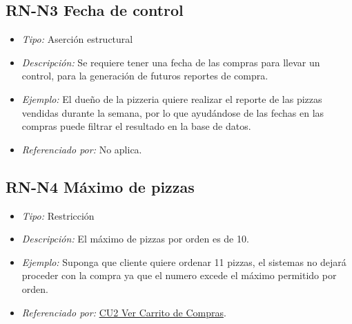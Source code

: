 \hypertarget{RN:N3:Fecha}{}
\subsection{RN-N3 Fecha de control}

\begin{itemize}
	
	\item \textit{Tipo:} Aserción estructural
	
	\item \textit{Descripción:} Se requiere tener una fecha de las compras para llevar un control, para la generación de futuros reportes de compra.
	
	\item \textit{Ejemplo:} El dueño de la pizzeria quiere realizar el reporte de las pizzas vendidas durante la semana, por lo que ayudándose de las fechas en las compras puede filtrar el resultado en la base de datos.
	
	\item \textit{Referenciado por:} No aplica.
	
\end{itemize}

\hypertarget{RN:N4:Maximo}{}
\subsection{RN-N4 Máximo de pizzas}

\begin{itemize}
	
	\item \textit{Tipo:} Restricción
	
	\item \textit{Descripción:} El máximo de pizzas por orden es de 10.
	
	\item \textit{Ejemplo:} Suponga que cliente quiere ordenar 11 pizzas, el sistemas no dejará proceder con la compra ya que el numero excede el máximo permitido por orden. 
	
	\item \textit{Referenciado por:} \hyperlink{CU2}{CU2 Ver Carrito de Compras}.
	
\end{itemize}

